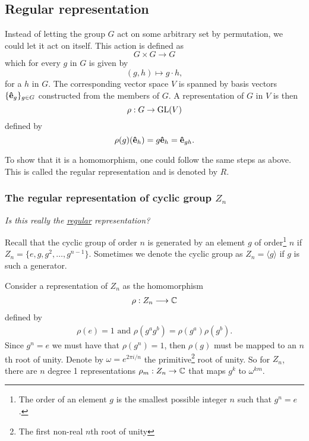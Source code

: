 \subsection{Regular representation}

	Instead of letting the group $G$ act on some arbitrary set by permutation, we could let it act on itself. This action is defined as
	\[
	G \times G \rightarrow G
	\]
	which for every $g$ in $G$ is given by 
	\[
	(g,h) \mapsto g \cdot h,
	\]
	for a $h$ in $G$. The corresponding vector space $V$ is spanned by basis vectors $\{\mathbf{\hat{e}}_g\}_{g \in G}$ constructed from the members of $G$. A representation of $G$ in $V$ is then
	\[
	\rho: G \rightarrow \text{GL}(V)
	\]
	defined by
	\[
	\rho(g)(\mathbf{\hat{e}}_h) = g\mathbf{\hat{e}}_h = \mathbf{\hat{e}}_{gh}.
	\]
	
	To show that it is a homomorphism, one could follow the same steps as above. This is called the regular representation and is denoted by $R$.
	
	\subsubsection{The regular representation of cyclic group $Z_n$}\label{sect:reprZn}
	
		\textit{Is this really the \underline{regular} representation?}
	
		Recall that the cyclic group of order $n$ is generated by an element $g$ of order\footnote{The order of an element $g$ is the smallest possible integer $n$ such that $g^n = e$.} $n$ if $Z_n = \{e, g, g^2, \dots, g^{n-1} \}$. Sometimes we denote the cyclic group as $Z_n = \langle g \rangle$ if $g$ is such a generator. %
		
		Consider a representation of $Z_n$ as the homomorphism
		\begin{align}
		\rho: Z_n \longrightarrow \mathbb{C}
		\end{align}
		defined by 
		\begin{align}
			\rho(e) = 1 \text{ and } \rho(g^a g^b) = \rho(g^a)\rho(g^b).
		\end{align}
		Since $g^n = e$ we must have that $\rho(g^n) = 1$, then $\rho(g)$ must be mapped to an $n$th root of unity. Denote by $\omega = e^{2\pi i/n}$ the primitive\footnote{The first non-real $n$th root of unity} root of unity. So for $Z_n$, there are $n$ degree 1 representations $\rho_m: Z_n \rightarrow \mathbb{C}$ that maps $g^k$ to $\omega^{km}$.
		
